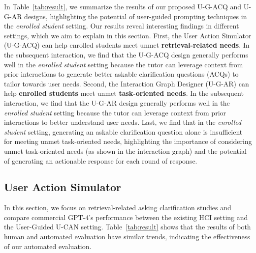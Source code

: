 \documentclass{article} %
\theoremstyle{definition}
\begin{document}
In Table~\ref{tab:result}, we summarize the results of our proposed U-G-ACQ and U-G-AR designs, highlighting the potential of user-guided prompting techniques in the \textit{enrolled student} setting.
Our results reveal interesting findings in different settings, which we aim to explain in this section.
First, the User Action Simulator (U-G-ACQ) can help enrolled students meet unmet \textbf{retrieval-related needs}.
In the subsequent interaction, we find that the U-G-ACQ design generally performs well in the \textit{enrolled student} setting because the tutor can leverage context from prior interactions to generate better askable clarification questions (ACQs) to tailor towards user needs.
Second, the Interaction Graph Designer (U-G-AR) can help \textbf{enrolled students} meet unmet \textbf{task-oriented needs}.
In the subsequent interaction, we find that the U-G-AR design generally performs well in the \textit{enrolled student} setting because the tutor can leverage context from prior interactions to better understand user needs.
Last, we find that in the \textit{enrolled student} setting, generating an askable clarification question alone is insufficient for meeting unmet task-oriented needs, highlighting the importance of considering unmet task-oriented needs (as shown in the interaction graph) and the potential of generating an actionable response for each round of response.
\subsection{User Action Simulator}
\label{subsec:retrieve}
In this section, we focus on retrieval-related asking clarification studies and compare commercial GPT-4's performance between the existing HCI setting and the User-Guided U-CAN setting.
Table~\ref{tab:result} shows that the results of both human and automated evaluation have similar trends, indicating the effectiveness of our automated evaluation.
\end{document}
